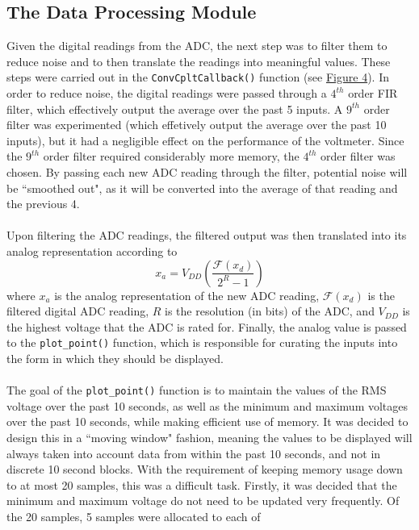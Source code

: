 \documentclass[12pt]{report}
\begin{document}
\subsection{The Data Processing Module}\label{dataproc}
Given the digital readings from the ADC, the next step was to filter them to reduce noise and to
then translate the readings into meaningful values. These steps were carried out in the
\texttt{ConvCpltCallback()} function (see \hyperref[adcflow]{Figure 4}). In order to reduce noise,
the digital readings
were passed through a $4^{th}$ order FIR filter, which effectively output the average over the past
5 inputs. A $9^{th}$ order filter was experimented (which effetively output the average over the
past 10 inputs), but it had a negligible effect on the performance of the voltmeter. Since the
$9^{th}$ order filter required considerably more memory, the $4^{th}$ order filter was chosen. By
passing each new ADC reading through the filter, potential noise will be ``smoothed out", as it will
be converted into the average of that reading and the previous 4.\\\\
Upon filtering the ADC readings, the filtered output was then translated into its analog
representation according to
\begin{equation}
	x_a = V_{DD}\left (\frac{\mathcal{F}(x_d)}{2^{R} -1}\right)
\end{equation}
where $x_a$ is the analog representation of the new ADC reading, $\mathcal{F}(x_d)$ is the filtered
digital ADC reading, $R$ is the resolution (in bits) of the ADC, and $V_{DD}$ is the highest voltage
that the ADC is rated for. Finally, the analog value is passed to the \texttt{plot\_point()}
function, which is responsible for curating the inputs into the form in which they should be
displayed.\\\\
The goal of the \texttt{plot\_point()} function is to maintain the values of the RMS voltage over
the past 10 seconds, as well as the minimum and maximum voltages over the past 10 seconds, while
making efficient use of memory. It was decided to design this in a ``moving window" fashion, meaning
the values to be displayed will always taken into account data from within the past 10 seconds, and
not in discrete 10 second blocks. With the requirement of keeping memory usage down to at most 20
samples, this was a difficult task. Firstly, it was decided that the minimum and maximum voltage do
not need to be updated very frequently. Of the 20 samples, 5 samples were allocated to each of
\end{document}
